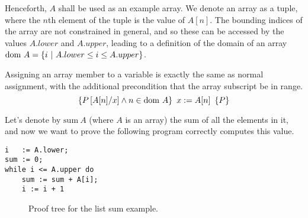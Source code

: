 Henceforth, $A$ shall be used as an example array. We denote an array
as a tuple, where the $n$th element of the tuple is the value of
$A[n]$. The bounding indices of the array are not constrained in
general, and so these can be accessed by the values $A.lower$ and
$A.upper$, leading to a definition of the domain of an array $\dom~A =
\{i~|~A.lower \leq i \leq A.upper\}$.

\begin{definition}
  Assigning an array member to a variable is exactly the same as
  normal assignment, with the additional precondition that the array
  subscript be in range.
  \[\htriplem{P\left[A[n]/x\right] \land n \in \dom~A}{x := A[n]}{P}\]
\end{definition}

\begin{example}
  \label{exmpl:heap-sum}
  
  Let's denote by $\mathrm{sum}~A$ (where $A$ is an array) the sum of
  all the elements in it, and now we want to prove the following
  program correctly computes this value.

\begin{lstlisting}
i   := A.lower;
sum := 0;
while i <= A.upper do
    sum := sum + A[i];
    i := i + 1
\end{lstlisting}

  \begin{figure}[t]
    \centering
      \begin{prooftree}




      \end{prooftree}
    \caption{Proof tree for the list sum example.}
    \label{fig:exmpl:heap-sum-tree}
  \end{figure}


\end{example}
